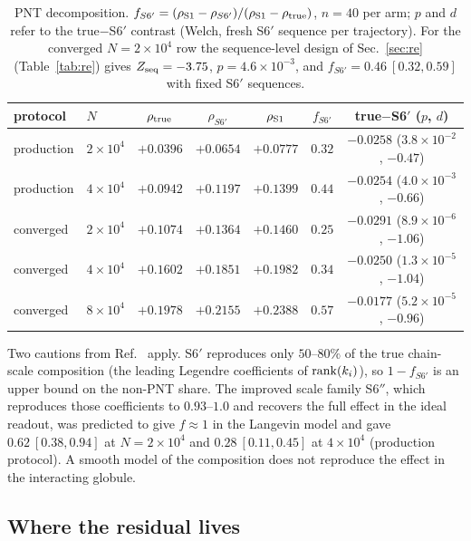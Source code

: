 \documentclass[reprint,amsmath,amssymb,aps,pre,longbibliography]{revtex4-2}
\begin{document}
\begin{table}[t]
\caption{PNT decomposition. $f_{S6'}=(\rho_{\rm S1}-\rho_{S6'})/(\rho_{\rm S1}-\rho_{\rm true})$,
$n=40$ per arm; $p$ and $d$ refer to the true$-$S6$'$ contrast (Welch, fresh S6$'$ sequence
per trajectory). For the converged $N=2\times10^{4}$ row the sequence-level design of
Sec.~\ref{sec:re} (Table~\ref{tab:re}) gives $Z_{\rm seq}=-3.75$, $p=4.6\times10^{-3}$, and
$f_{S6'}=0.46\ [0.32,0.59]$ with fixed S6$'$ sequences.}
\label{tab:pnt}
\begin{ruledtabular}
\begin{tabular}{llccccc}
protocol & $N$ & $\rho_{\rm true}$ & $\rho_{S6'}$ & $\rho_{\rm S1}$ & $f_{S6'}$ & true$-$S6$'$ ($p$, $d$)\\ \hline
production & $2\times10^{4}$ & $+0.0396$ & $+0.0654$ & $+0.0777$ & $0.32$ & $-0.0258$ ($3.8\times10^{-2}$, $-0.47$)\\
production & $4\times10^{4}$ & $+0.0942$ & $+0.1197$ & $+0.1399$ & $0.44$ & $-0.0254$ ($4.0\times10^{-3}$, $-0.66$)\\
converged  & $2\times10^{4}$ & $+0.1074$ & $+0.1364$ & $+0.1460$ & $0.25$ & $-0.0291$ ($8.9\times10^{-6}$, $-1.06$)\\
converged  & $4\times10^{4}$ & $+0.1602$ & $+0.1851$ & $+0.1982$ & $0.34$ & $-0.0250$ ($1.3\times10^{-5}$, $-1.04$)\\
converged  & $8\times10^{4}$ & $+0.1978$ & $+0.2155$ & $+0.2388$ & $0.57$ & $-0.0177$ ($5.2\times10^{-5}$, $-0.96$)\\
\end{tabular}
\end{ruledtabular}
\end{table}

Two cautions from Ref.~\cite{PDTP4} apply. S6$'$ reproduces only $50$--$80\%$ of the true
chain-scale composition (the leading Legendre coefficients of ${\rm rank}(k_i)$), so
$1-f_{S6'}$ is an upper bound on the non-PNT share. The improved scale family S6$''$, which
reproduces those coefficients to $0.93$--$1.0$ and recovers the full effect in the ideal
readout, was predicted to give $f\approx1$ in the Langevin model and gave $0.62\ [0.38,0.94]$
at $N=2\times10^{4}$ and $0.28\ [0.11,0.45]$ at $4\times10^{4}$ (production protocol). A
smooth model of the composition does not reproduce the effect in the interacting globule.

\subsection{Where the residual lives}
\end{document}

